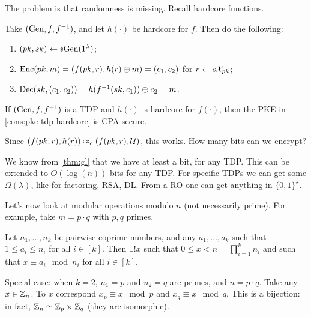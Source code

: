 The problem is that randomness is missing.
Recall hardcore functions.
\begin{construction} \label{cons:pke-tdp-hardcore}
	Take $(\mathrm{Gen}, f, f^{-1})$, and let $h(\cdot)$ be hardcore for $f$.
	Then do the following:
	\begin{enumerate}
		\item $(pk, sk) \leftarrow {\scriptstyle \$} {\mathrm{Gen}(1^{\lambda})}$;
		\item $\mathrm{Enc}(pk, m) = (f(pk, r), h(r) \oplus m) = (c_1, c_2)$ for $r \leftarrow {\scriptstyle \$} {\mathcal{X}_{pk}}$;
		\item $\mathrm{Dec}(sk, (c_1, c_2)) = h(f^{-1}(sk, c_1)) \oplus c_2 = m$.
	\end{enumerate}
\end{construction}

\begin{theorem}
	If $(\mathrm{Gen}, f, f^{-1})$ is a \ac{TDP} and $h(\cdot)$ is hardcore for $f(\cdot)$, then the \ac{PKE} in \cref{cons:pke-tdp-hardcore} is \ac{CPA}-secure.
\end{theorem}

Since $(f(pk, r), h(r)) \approx_c  (f(pk, r), \mathcal{U})$, this works.
How many bits can we encrypt?

We know from \cref{thm:gl} that we have at least a bit, for any \ac{TDP}.
This can be extended to $O(\log(n))$ bits for any \ac{TDP}.
For specific \acp{TDP} we can get some $\Omega(\lambda)$, like for factoring, \ac{RSA}, \ac{DL}.
From a \ac{RO} one can get anything in $\{0,1\}^{\star}$.

Let's now look at modular operations modulo $n$ (not necessarily prime).
For example, take $m = p \cdot q$ with $p,q$ primes.

\begin{theorem} \label{thm:crt}
	Let $n_1, \dots, n_k$ be pairwise coprime numbers, and any $a_1, \dots, a_k$ such that $1 \le a_i \le n_i$ for all $i \in [k]$.
	Then $\exists ! x$ such that $0 \le x < n = \prod_{i=1}^{k} n_i$ and such that $x \equiv a_i \mod n_i$ for all $i \in [k]$.
\end{theorem}

Special case: when $k = 2$, $n_1 = p$ and $n_2 = q$ are primes, and $n = p \cdot q$.
Take any $x \in \mathbb{Z}_n$.
To $x$ correspond $x_p \equiv x \mod p$ and $x_q \equiv x \mod q$.
This is a bijection: in fact, $\mathbb{Z}_n \simeq \mathbb{Z}_p \times \mathbb{Z}_q$ (\ie they are isomorphic).

